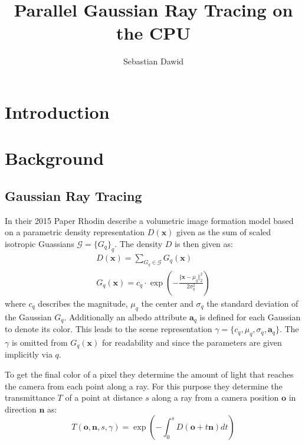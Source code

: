 \documentclass[a4paper, 11pt]{memoir}
\title{Parallel Gaussian Ray Tracing on the CPU}
\author{Sebastian Dawid}
\begin{document}
    \frontmatter
    \smarttitle
    \newpage
    \tableofcontents*

    \clearpage
    \thispagestyle{abs}
    \abstractintoc
    \begin{abstract}
        \lipsum[1]
    \end{abstract}

    \mainmatter
    \chapter{Introduction}

    \chapter{Background}
    \label{ch:background}
    \section{Gaussian Ray Tracing}
    \label{sec:int_grt}
    In their 2015 Paper  \cite{Rhodin:2015} Rhodin \etal describe a volumetric image formation
    model based on a parametric density representation $D(\mathbf{x})$ given as the sum of scaled isotropic Guassians
    $\mathcal{G} = \{ G_q \}_q$. The density $D$ is then given as:
    \begin{align}
        D(\mathbf{x}) = \sum_{G_q \in \mathcal{G}} G_q(\mathbf{x})
        \label{eq:density}\\
        G_q(\mathbf{x}) = c_q \cdot \exp{\left( - \frac{\Vert\mathbf{x} - \mu_q\Vert_2^2}{2\sigma_q^2} \right)}
        \label{eq:gaussian}
    \end{align}
    where $c_q$ describes the magnitude, $\mu_q$ the center and $\sigma_q$ the standard deviation of the Gaussian $G_q$.
    Additionally an \gls{albedo} attribute $\mathbf{a}_q$ is defined for each Gaussian to denote its color. This leads
    to the scene representation $\gamma = \{ c_q, \mu_q, \sigma_q, \mathbf{a}_q \}$. The $\gamma$ is omitted from
    $G_q(\mathbf{x})$ for readability and since the parameters are given implicitly via $q$.

    To get the final color of a pixel they determine the amount of light that reaches the camera from each point
    along a ray. For this purpose they determine the \gls{transmittance} $T$ of a point at distance $s$ along a ray from
    a camera position $\mathbf{o}$ in direction $\mathbf{n}$ as:
    \begin{equation}
        T(\mathbf{o}, \mathbf{n}, s, \gamma) = \exp{\left( - \int_0^s D(\mathbf{o} + t\mathbf{n}) dt \right)}
        \label{eq:transmittance}
    \end{equation}
\end{document}
